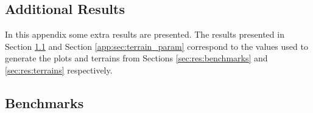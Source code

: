 
\begin{landscape}
	\pagestyle{lscape}
\section{Additional Results}
  
  In this appendix some extra results are presented. The results presented in Section \ref{app:sec:benchmarks} and Section \ref{app:sec:terrain_param} correspond to the values used to generate the plots and terrains from Sections \ref{sec:res:benchmarks} and \ref{sec:res:terrains} respectively.

  \subsection{Benchmarks} \label{app:sec:benchmarks}

\vspace*{\fill}


\end{landscape}
